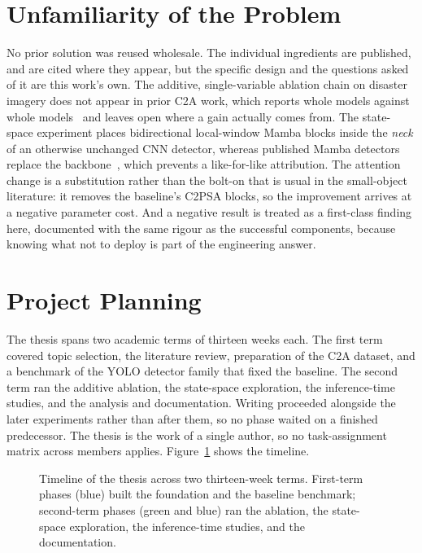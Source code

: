 \section{Unfamiliarity of the Problem}
No prior solution was reused wholesale. The individual ingredients are
published, and are cited where they appear, but the specific design and the
questions asked of it are this work's own. The additive, single-variable
ablation chain on disaster imagery does not appear in prior C2A work, which
reports whole models against whole models~\cite{nihal2024c2a} and leaves open
where a gain actually comes from. The state-space experiment places
bidirectional local-window Mamba blocks inside the \emph{neck} of an
otherwise unchanged CNN detector, whereas published Mamba detectors replace
the backbone~\cite{wang2025mambayolo}, which prevents a like-for-like
attribution. The attention change is a substitution rather than the bolt-on
that is usual in the small-object literature: it removes the baseline's
C2PSA blocks, so the improvement arrives at a negative parameter cost. And a
negative result is treated as a first-class finding here, documented with
the same rigour as the successful components, because knowing what not to
deploy is part of the engineering answer.

\section{Project Planning}
The thesis spans two academic terms of thirteen weeks each. The first term
covered topic selection, the literature review, preparation of the C2A
dataset, and a benchmark of the YOLO detector family that fixed the baseline.
The second term ran the additive ablation, the state-space exploration, the
inference-time studies, and the analysis and documentation. Writing proceeded
alongside the later experiments rather than after them, so no phase waited on
a finished predecessor. The thesis is the work of a single author, so no
task-assignment matrix across members applies. Figure~\ref{fig:gantt} shows
the timeline.

\begin{figure}[tbp]
  \centering
  \resizebox{\linewidth}{!}{}
  \caption[Timeline of the thesis across two thirteen-week terms.]{Timeline of the thesis across two thirteen-week terms. First-term
  phases (blue) built the foundation and the baseline benchmark; second-term
  phases (green and blue) ran the ablation, the state-space exploration, the
  inference-time studies, and the documentation.}
  \label{fig:gantt}
\end{figure}

